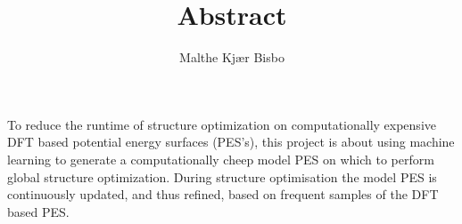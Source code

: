 \documentclass[english,a4paper,oneside, onecolumn,article,9pt]{memoir}
\title{Abstract}
\author{Malthe Kjær Bisbo}
\date{\vspace{-5ex}}
\begin{document}
\thispagestyle{empty}
\maketitle

To reduce the runtime of structure optimization on computationally expensive DFT based potential energy surfaces (PES's), this project is about using machine learning to generate a computationally cheep model PES on which to perform global structure optimization. During structure optimisation the model PES is continuously updated, and thus refined, based on frequent samples of the DFT based PES.
\end{document}
